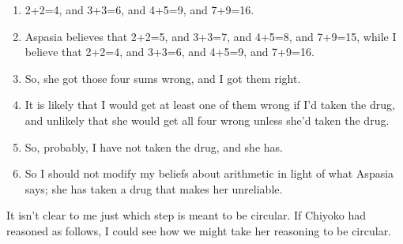 \begin{enumerate}
\item{} 2+2=4, and 3+3=6, and 4+5=9, and 7+9=16.

\item{} \gls{Aspasia} believes that 2+2=5, and 3+3=7, and 4+5=8, and 7+9=15, while I believe that 2+2=4, and 3+3=6, and 4+5=9, and 7+9=16.

\item{} So, she got those four sums wrong, and I got them right.

\item{} It is likely that I would get at least one of them wrong if I'd taken the drug, and unlikely that she would get all four wrong unless she'd taken the drug.

\item{} So, probably, I have not taken the drug, and she has.

\item{} So I should not modify my beliefs about arithmetic in light of what \gls{Aspasia} says; she has taken a drug that makes her unreliable.

\end{enumerate}
It isn't clear to me just which step is meant to be circular. If \gls{Chiyoko} had reasoned as follows, I could see how we might take her reasoning to be circular.

